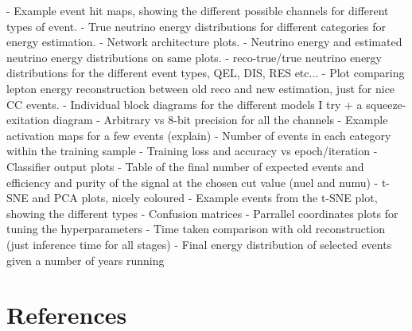 - Example event hit maps, showing the different possible channels for different types of event.
- True neutrino energy distributions for different categories for energy estimation.
- Network architecture plots.
- Neutrino energy and estimated neutrino energy distributions on same plots.
- reco-true/true neutrino energy distributions for the different event types, QEL, DIS, RES etc...
- Plot comparing lepton energy reconstruction between old reco and new estimation, just for nice CC events.
- Individual block diagrams for the different models I try + a squeeze-exitation diagram
- Arbitrary vs 8-bit precision for all the channels
- Example activation maps for a few events (explain)
- Number of events in each category within the training sample
- Training loss and accuracy vs epoch/iteration
- Classifier output plots
- Table of the final number of expected events and efficiency and purity of the signal at the chosen cut value (nuel and numu)
- t-SNE and PCA plots, nicely coloured
- Example events from the t-SNE plot, showing the different types
- Confusion matrices
- Parrallel coordinates plots for tuning the hyperparameters
- Time taken comparison with old reconstruction (just inference time for all stages)
- Final energy distribution of selected events given a number of years running

\section{References}


